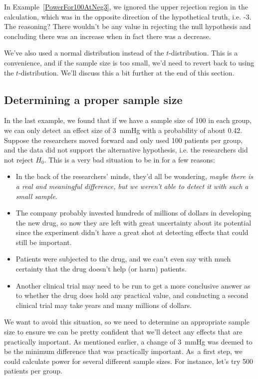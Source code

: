 In Example~\ref{PowerFor100AtNeg3}, we ignored the upper
rejection region in the calculation, which was in the
opposite direction of the hypothetical truth, i.e. -3.
The reasoning?
There wouldn't be any value in rejecting the null hypothesis
and concluding there was an increase when in fact there was
a decrease.

We've also used a normal distribution instead
of the $t$-distribution.
This is a convenience, and if the sample size is too small,
we'd need to revert back to using the $t$-distribution.
We'll discuss this a bit further at the end of this section.


\D{\newpage}

\subsection{Determining a proper sample size}

In the last example, we found that if we have a sample size
of 100 in each group, we can only detect an effect size of
3~mmHg with a probability of about 0.42.
Suppose the researchers moved forward and only used
100 patients per group, and the data did not support
the alternative hypothesis,
i.e. the researchers did not reject $H_0$.
This is a very bad situation to be in for a few reasons:
\begin{itemize}
\setlength{\itemsep}{0mm}
\item
    In the back of the researchers' minds, they'd all be
    wondering, \emph{maybe there is a real and meaningful
    difference, but we weren't able to detect it with such
    a small sample}. 
\item
    The company probably invested hundreds of millions
    of dollars in developing the new drug, so now they
    are left with great uncertainty about its potential
    since the experiment didn't have a great shot at
    detecting effects that could still be important.
\item
    Patients were subjected to the drug, and we can't even
    say with much certainty that the drug doesn't help
    (or harm) patients.
\item
    Another clinical trial may need to be run to get a more
    conclusive answer as to whether the drug does hold any
    practical value, and conducting a second clinical trial
    may take years and many millions of dollars.
\end{itemize}
We want to avoid this situation, so we need to determine
an appropriate sample size to ensure we can be pretty
confident that we'll detect any effects that are practically
important.
As mentioned earlier, a change of 3~mmHg was deemed to be the
minimum difference that was practically important.
As~a first step, we could calculate power for several
different sample sizes.
For instance, let's try 500 patients per group.

